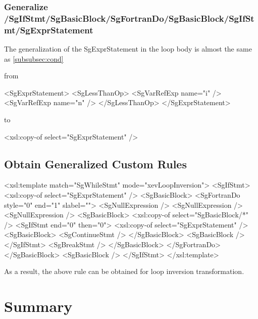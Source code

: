 \subsubsection{Generalize /SgIfStmt/SgBasicBlock/SgFortranDo/SgBasicBlock/SgIfStmt/SgExprStatement}

The generalization of the SgExprStatement in the loop body is almost the same as \ref{subsubsec:cond}

from

\begin{framed}
\begin{src}
					<SgExprStatement>
						<SgLessThanOp>
							<SgVarRefExp name="i" />
							<SgVarRefExp name="n" />
						</SgLessThanOp>
					</SgExprStatement>
\end{src}
\end{framed}

to

\begin{framed}
\begin{src}
		<xsl:copy-of select="SgExprStatement" />
\end{src}
\end{framed}


\subsection{Obtain Generalized Custom Rules}



\begin{framed}
\begin{src}
<xsl:template match="SgWhileStmt" mode="xevLoopInversion">
	<SgIfStmt>
		<xsl:copy-of select="SgExprStatement" />
		<SgBasicBlock>
			<SgFortranDo style="0" end="1" slabel="">
				<SgNullExpression />
				<SgNullExpression />
				<SgNullExpression />
				<SgBasicBlock>
					<xsl:copy-of select="SgBasicBlock/*" />
					<SgIfStmt end="0" then="0">
						<xsl:copy-of select="SgExprStatement" />
						<SgBasicBlock>
							<SgContinueStmt />
						</SgBasicBlock>
						<SgBasicBlock />
					</SgIfStmt>
					<SgBreakStmt />
				</SgBasicBlock>
			</SgFortranDo>
		</SgBasicBlock>
		<SgBasicBlock />
	</SgIfStmt>
</xsl:template>
\end{src}
\end{framed}


As a result, the above rule can be obtained for loop inversion transformation.


\section{Summary}


\fi
